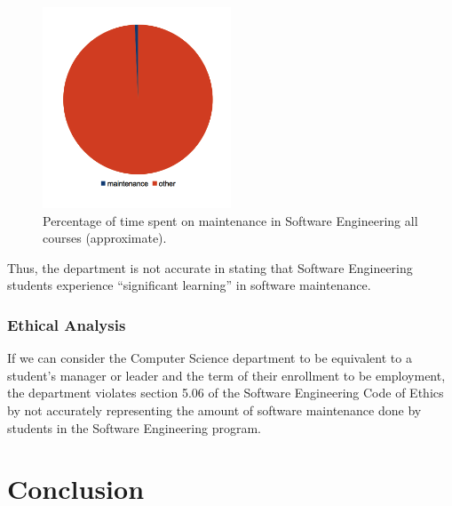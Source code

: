 \documentclass[11pt]{article}
\begin{document}
\begin{multicols}{2}
\begin{figure}[tb!]
  \caption{Percentage of time spent on maintenance in Software Engineering all courses (approximate).}
  \centering
    \includegraphics[width=0.5\textwidth]{termpaper/images/pie-chart-03}
\end{figure}

Thus, the department is not accurate in stating that Software Engineering students experience ``significant learning'' in software maintenance.

\subsubsection{Ethical Analysis}

If we can consider the Computer Science department to be equivalent to a student's manager or leader and the term of their enrollment to be employment, the department violates section 5.06 of the Software Engineering Code of Ethics by not accurately representing the amount of software maintenance done by students in the Software Engineering program.


%
%
%



\section{Conclusion}

\end{multicols}
\newpage

\nocite{*}




\end{document}
